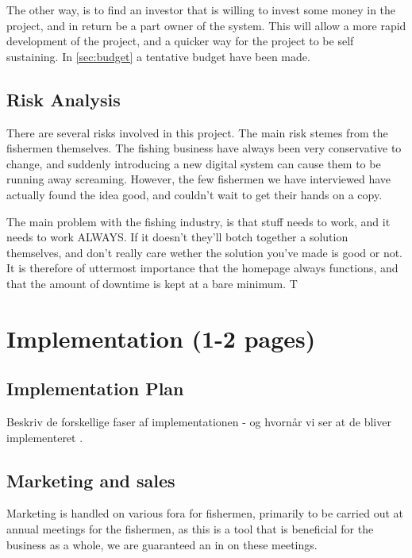 \documentclass[a4paper,10pt,oneside,fleqn]{article}
\begin{document}
The other way, is to find an investor that is willing to invest some money in the project, and in return be a part owner of the system. This will allow a more rapid development of the project, and a quicker way for the project to be self sustaining. In \ref{sec:budget} a tentative budget have been made.

\subsection{Risk Analysis}
There are several risks involved in this project. The main risk stemes from the fishermen themselves. The fishing business have always been very conservative to change, and suddenly introducing a new digital system can cause them to be running away screaming. However, the few fishermen we have interviewed have actually found the idea good, and couldn't wait to get their hands on a copy. 

The main problem with the fishing industry, is that stuff needs to work, and it needs to work ALWAYS. If it doesn't they'll botch together a solution themselves, and don't really care wether the solution you've made is good or not. It is therefore of uttermost importance that the homepage always functions, and that the amount of downtime is kept at a bare minimum. T


\section{Implementation (1-2 pages)}
\subsection{Implementation Plan}
Beskriv de forskellige faser af implementationen - og hvornår vi ser at de bliver implementeret .

\subsection{Marketing and sales}
Marketing is handled on various fora for fishermen, primarily to be carried out at annual meetings for the fishermen, as this is a tool that is beneficial for the business as a whole, we are guaranteed an in on these meetings. 
\end{document}
